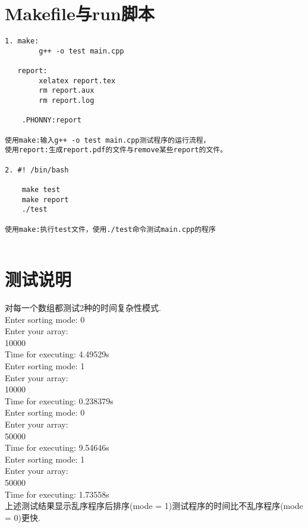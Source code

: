 \documentclass[a4paper]{article}
\begin{document}
\section{Makefile与run脚本}
\begin{lstlisting}
1. make:
        g++ -o test main.cpp
    
   report:
        xelatex report.tex
        rm report.aux
        rm report.log
    
    .PHONNY:report
        
使用make:输入g++ -o test main.cpp测试程序的运行流程，
使用report:生成report.pdf的文件与remove某些report的文件。

2. #! /bin/bash

    make test
    make report
    ./test
    
使用make:执行test文件，使用./test命令测试main.cpp的程序
    
\end{lstlisting}

\section{测试说明}
对每一个数组都测试2种的时间复杂性模式.\\
Enter sorting mode: 0 \\
Enter your array: \\
10000 \\
Time for executing: 4.49529s \\

Enter sorting mode: 1 \\
Enter your array: \\ 
10000 \\
Time for executing: 0.238379s \\

Enter sorting mode: 0 \\
Enter your array: \\
50000 \\
Time for executing: 9.54646s \\

Enter sorting mode: 1 \\
Enter your array: \\
50000 \\
Time for executing: 1.73558s \\

上述测试结果显示乱序程序后排序(mode = 1)测试程序的时间比不乱序程序(mode = 0)更快. \\
\end{document}
